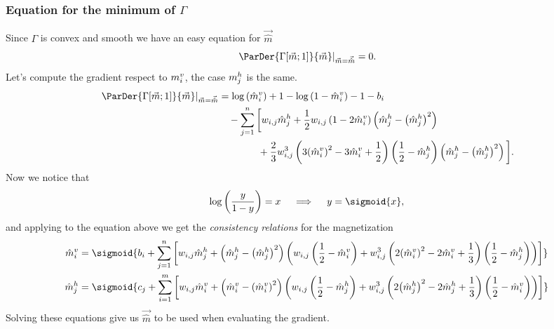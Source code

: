 \subsubsection{Equation for the minimum of \(\Gamma\)}
Since \(\Gamma\) is convex and smooth we have an easy equation for \(\vec{\hat{m}}\)
\[
  \left.\ParDer{\Gam{\vec{m}}{1}}{\vec{m}}\right|_{\vec{m}=\vec{\hat{m}}}=0.
\]
Let's compute the gradient respect to \(m_i^v\), the case \(m_j^h\) is  the same.
\begin{align*}
  \left.\ParDer{\Gam{\vec{m}}{1}}{\vec{m}}\right|_{\vec{m}=\vec{\hat{m}}}
    &= \log\left(\hmvi\right) + 1 - \log\left(1-\hmvi\right) - 1 - b_i \\
    &\quad-\sum_{j=1}^n\bigg[w_{i,j}\hmhj
      +\frac{1}{2}w_{i,j}\left(1-2\hmvi\right)\left(\hmhj-\hmhjsq\right) \\
      &\qquad\qquad+\frac{2}{3}w_{i,j}^3\left(3\hmvisq-3\hmvi+\frac{1}{2}\right)\left(\frac{1}{2}-\hmhj\right)
      \left(\hmhj-\hmhjsq\right)\bigg].
\end{align*}
Now we notice that
\[
  \log{\left(\frac{y}{1-y}\right)} = x \quad \implies \quad y = \sigmoid{x},
\]
and  applying to the equation above we get the \emph{consistency relations} for the magnetization
\begin{align}
  \hmvi&=\sigmoid{b_i + \sum_{j=1}^n\left[w_{i,j}\hmhj+
           \left(\hmhj-\hmhjsq\right)\left(w_{i,j}\left(\frac{1}{2}-\hmvi\right)
           +w_{i,j}^3\left(2\hmvisq-2\hmvi+\frac{1}{3}\right)\left(\frac{1}{2}-\hmhj\right)
           \right)\right]}\\
  \hmhj&=\sigmoid{c_j + \sum_{i=1}^m\left[w_{i,j}\hmvi+
           \left(\hmvi-\hmvisq\right)\left(w_{i,j}\left(\frac{1}{2}-\hmhj\right)
           +w_{i,j}^3\left(2\hmhjsq-2\hmhj+\frac{1}{3}\right)\left(\frac{1}{2}-\hmvi\right)
           \right)\right]}
\end{align}
Solving these equations give us \(\vec{\hat{m}}\) to be used when evaluating the gradient.

